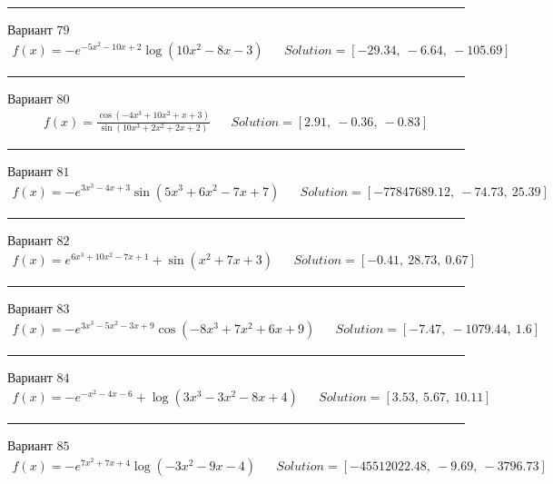 \documentclass[11pt]{report}
\begin{document}
\begin{center}
    \noindent\rule{8cm}{0.4pt}
\end{center}
Вариант \(79\)
\begin{align*}
    f(x) = - e^{- 5 x^{2} - 10 x + 2} \log{\left(10 x^{2} - 8 x - 3 \right)} && Solution = \left[ -29.34, \  -6.64, \  -105.69\right]
\end{align*}
\begin{center}
    \noindent\rule{8cm}{0.4pt}
\end{center}
Вариант \(80\)
\begin{align*}
    f(x) = \frac{\cos{\left(- 4 x^{3} + 10 x^{2} + x + 3 \right)}}{\sin{\left(10 x^{3} + 2 x^{2} + 2 x + 2 \right)}} && Solution = \left[ 2.91, \  -0.36, \  -0.83\right]
\end{align*}
\begin{center}
    \noindent\rule{8cm}{0.4pt}
\end{center}
Вариант \(81\)
\begin{align*}
    f(x) = - e^{3 x^{3} - 4 x + 3} \sin{\left(5 x^{3} + 6 x^{2} - 7 x + 7 \right)} && Solution = \left[ -77847689.12, \  -74.73, \  25.39\right]
\end{align*}
\begin{center}
    \noindent\rule{8cm}{0.4pt}
\end{center}
Вариант \(82\)
\begin{align*}
    f(x) = e^{6 x^{3} + 10 x^{2} - 7 x + 1} + \sin{\left(x^{2} + 7 x + 3 \right)} && Solution = \left[ -0.41, \  28.73, \  0.67\right]
\end{align*}
\begin{center}
    \noindent\rule{8cm}{0.4pt}
\end{center}
Вариант \(83\)
\begin{align*}
    f(x) = - e^{3 x^{3} - 5 x^{2} - 3 x + 9} \cos{\left(- 8 x^{3} + 7 x^{2} + 6 x + 9 \right)} && Solution = \left[ -7.47, \  -1079.44, \  1.6\right]
\end{align*}
\begin{center}
    \noindent\rule{8cm}{0.4pt}
\end{center}
Вариант \(84\)
\begin{align*}
    f(x) = - e^{- x^{2} - 4 x - 6} + \log{\left(3 x^{3} - 3 x^{2} - 8 x + 4 \right)} && Solution = \left[ 3.53, \  5.67, \  10.11\right]
\end{align*}
\begin{center}
    \noindent\rule{8cm}{0.4pt}
\end{center}
Вариант \(85\)
\begin{align*}
    f(x) = - e^{7 x^{2} + 7 x + 4} \log{\left(- 3 x^{2} - 9 x - 4 \right)} && Solution = \left[ -45512022.48, \  -9.69, \  -3796.73\right]
\end{align*}
\end{document}
